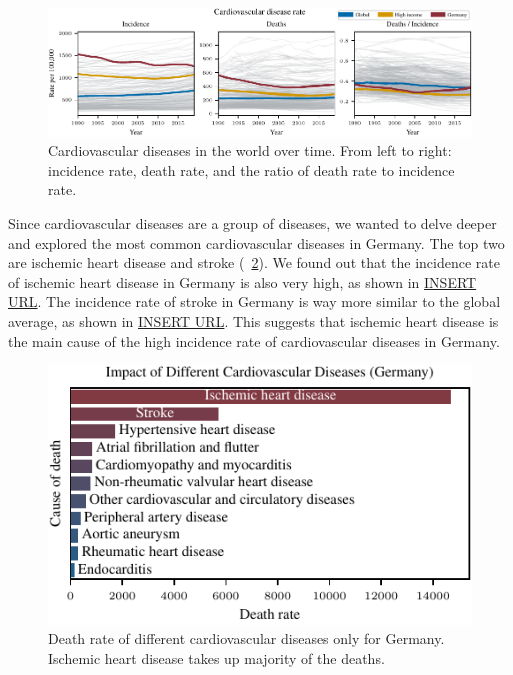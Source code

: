 \begin{figure}[h]
    \vskip 0.2in
    \centering
    \centerline{\includegraphics[]{fig/fig_cardiovascular_disease_rate.pdf}}
    \caption{Cardiovascular diseases in the world over time. From left to right: incidence rate, death rate, 
    and the ratio of death rate to incidence rate.}
    \label{Cardiovascular diseases over time}
\end{figure}

Since cardiovascular diseases are a group of diseases, we wanted to delve deeper and explored the most common cardiovascular diseases in Germany. The top two are ischemic heart disease and stroke (\figurename~\ref{Impact of Different CVDs}). 
We found out that the incidence rate of ischemic heart disease in Germany is also very high, as shown in \url{INSERT URL}. 
The incidence rate of stroke in Germany is way more similar to the global average, as shown in \url{INSERT URL}. This suggests that ischemic heart disease is the main cause of the high incidence rate of cardiovascular diseases in Germany.

\begin{figure}[ht]
    \vskip 0.2in
    \begin{center}
    \centerline{\includegraphics[width=\columnwidth]{fig/fig_ImpactOfDifferentCVDs.pdf}}
    \caption{Death rate of different cardiovascular diseases only for Germany. Ischemic heart disease takes up majority of the deaths.}
    \label{Impact of Different CVDs}
    \end{center}
    \vskip -0.2in
\end{figure}

